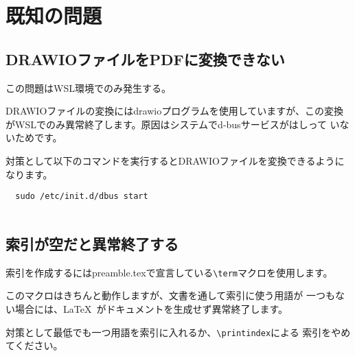 \chapter{既知の問題}
\label{sec:appendix10}

\section{DRAWIOファイルをPDFに変換できない}
この問題はWSL環境でのみ発生する。

DRAWIOファイルの変換にはdrawioプログラムを使用していますが、この変換
がWSLでのみ異常終了します。原因はシステムでd-busサービスがはしって
いないためです。

対策として以下のコマンドを実行するとDRAWIOファイルを変換できるようになります。

\begin{lstlisting}
  sudo /etc/init.d/dbus start
  
\end{lstlisting}

\section{索引が空だと異常終了する}
索引を作成するにはpreamble.texで宣言している\lstinline{\term}マクロを使用します。

このマクロはきちんと動作しますが、文書を通して索引に使う用語が
一つもない場合には、\LaTeX\ がドキュメントを生成せず異常終了します。

対策として最低でも一つ用語を索引に入れるか、\lstinline{\printindex}による
索引をやめてください。